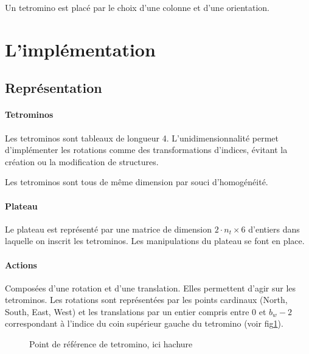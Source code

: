 \documentclass{report}
\begin{document}
Un tetromino est placé par le choix d'une colonne et d'une orientation.

\section{L'implémentation}

\subsection{Représentation}

\paragraph{Tetrominos}
Les tetrominos sont tableaux de longueur 4. L'unidimensionnalité permet
d'implémenter les rotations comme des transformations d'indices, évitant la
création ou la modification de structures.

Les tetrominos sont tous de même dimension par souci d'homogénéité.

\paragraph{Plateau}
Le plateau est représenté par une matrice de dimension
\(2\cdot n_t \times 6\) d'entiers dans laquelle on inscrit les tetrominos. Les
manipulations du plateau se font en place.


\paragraph{Actions}
Composées d'une rotation et d'une translation. Elles permettent d'agir sur les
tetrominos. Les rotations sont représentées par les points cardinaux
(North, South, East, West) et les translations par un entier compris entre 0 et
\(b_w - 2\) correspondant à l'indice du coin supérieur gauche du tetromino
(voir fig\ref{fig:tetref}).

\begin{figure}[h]
  \centering
  \qquad
  \caption{Point de référence de tetromino, ici hachure}\label{fig:tetref}
\end{figure}
\end{document}
